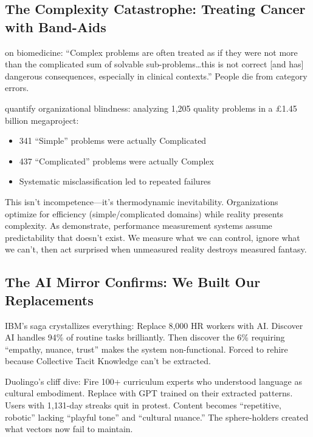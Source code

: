 \subsection{The Complexity Catastrophe: Treating Cancer with Band-Aids}

\citet{kempermann2017} on biomedicine: ``Complex problems are often treated as if they were not more than the complicated sum of solvable sub-problems\ldots this is not correct [and has] dangerous consequences, especially in clinical contexts.'' People die from category errors.

\citet{ford2024} quantify organizational blindness: analyzing 1,205 quality problems in a £1.45 billion megaproject:
\begin{itemize}
\item 341 ``Simple'' problems were actually Complicated
\item 437 ``Complicated'' problems were actually Complex
\item Systematic misclassification led to repeated failures
\end{itemize}

This isn't incompetence---it's thermodynamic inevitability. Organizations optimize for efficiency (simple/complicated domains) while reality presents complexity. As \citet{alexander2018} demonstrate, performance measurement systems assume predictability that doesn't exist. We measure what we can control, ignore what we can't, then act surprised when unmeasured reality destroys measured fantasy.

\subsection{The AI Mirror Confirms: We Built Our Replacements}

IBM's saga crystallizes everything: Replace 8,000 HR workers with AI. Discover AI handles 94\% of routine tasks brilliantly. Then discover the 6\% requiring ``empathy, nuance, trust'' makes the system non-functional. Forced to rehire because \citet{collins2010} Collective Tacit Knowledge can't be extracted.

Duolingo's cliff dive: Fire 100+ curriculum experts who understood language as cultural embodiment. Replace with GPT trained on their extracted patterns. Users with 1,131-day streaks quit in protest. Content becomes ``repetitive, robotic'' lacking ``playful tone'' and ``cultural nuance.'' The sphere-holders created what vectors now fail to maintain.

